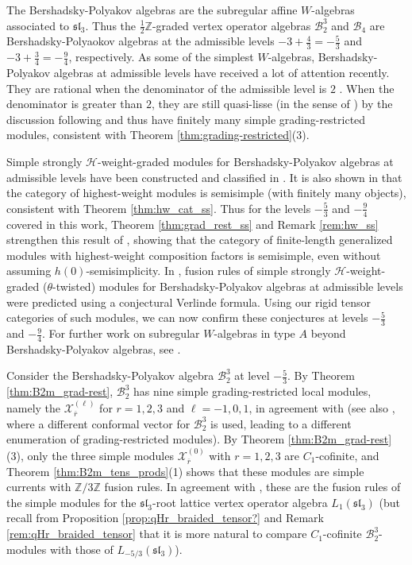 \documentclass[11pt, reqno]{amsart}
\theoremstyle{definition}\newtheorem{defi}[thm]{Definition}
\theoremstyle{definition}\newtheorem{rem}[thm]{Remark}
\theoremstyle{definition}\newtheorem{exam}[thm]{Example}
\theoremstyle{definition}\newtheorem{assum}[thm]{Assumption}
\newcommand{\cB}{\mathcal{B}}
\newcommand{\cH}{\mathcal{H}}
\newcommand{\cX}{\mathcal{X}}
\newcommand{\ZZ}{\mathbb{Z}}
\begin{document}
The Bershadsky-Polyakov algebras \cite{Po, Be} are the subregular affine $W$-algebras associated to $\mathfrak{sl}_3$. Thus the $\frac{1}{2}\ZZ$-graded vertex operator algebras $\cB_2^3$ and $\cB_4$ are Bershadsky-Polyaokov algebras at the admissible levels $-3+\frac{4}{3}=-\frac{5}{3}$ and $-3+\frac{3}{4}=-\frac{9}{4}$, respectively. As some of the simplest $W$-algebras, Bershadsky-Polyakov algebras at admissible levels have received a lot of attention recently. They are rational when the denominator of the admissible level is $2$ \cite{Ar-BP}. When the denominator is greater than $2$, they are still quasi-lisse (in the sense of \cite{AK}) by the discussion following \cite[Lemma 6.3]{AK} and thus have finitely many simple grading-restricted modules, consistent with Theorem \ref{thm:grading-restricted}(3).

Simple strongly $\cH$-weight-graded modules for Bershadsky-Polyakov algebras at admissible levels have been constructed and classified in \cite{AK1, AK2, FKR, AKR}. It is also shown in \cite{FKR} that the category of highest-weight modules is semisimple (with finitely many objects), consistent with Theorem \ref{thm:hw_cat_ss}. Thus for the levels $-\frac{5}{3}$ and $-\frac{9}{4}$ covered in this work, Theorem \ref{thm:grad_rest_ss} and Remark \ref{rem:hw_ss} strengthen this result of \cite{FKR}, showing that the category of finite-length generalized modules with highest-weight composition factors is semisimple, even without assuming $h(0)$-semisimplicity. In \cite{FR}, fusion rules of simple strongly $\cH$-weight-graded ($\theta$-twisted) modules for Bershadsky-Polyakov algebras at admissible levels were predicted using a conjectural Verlinde formula. Using our rigid tensor categories of such modules, we can now confirm these conjectures at levels $-\frac{5}{3}$ and $-\frac{9}{4}$. For further work on subregular $W$-algebras in type $A$ beyond Bershadsky-Polyakov algebras, see \cite{Fe}.

Consider the Bershadsky-Polyakov algebra $\cB_2^3$ at level $-\frac{5}{3}$. By Theorem \ref{thm:B2m_grad-rest}, $\cB_2^3$ has nine simple grading-restricted local modules, namely the $\cX_{\overline{r}}^{(\ell)}$ for $r=1,2,3$ and $\ell=-1,0,1$, in agreement with \cite[Section 5.3.1]{FR} (see also \cite[Section 5]{AK1}, where a different conformal vector for $\cB_2^3$ is used, leading to a different enumeration of grading-restricted modules). By Theorem \ref{thm:B2m_grad-rest}(3), only the three simple modules $\cX_{\overline{r}}^{(0)}$ with $r=1,2,3$ are $C_1$-cofinite, and Theorem \ref{thm:B2m_tens_prods}(1) shows that these modules are simple currents with $\ZZ/3\ZZ$ fusion rules. In agreement with \cite[Proposition 5.9]{FR}, these are the fusion rules of the  simple modules for the $\mathfrak{sl}_3$-root lattice vertex operator algebra $L_1(\mathfrak{sl}_3)$ (but recall from Proposition \ref{prop:qHr_braided_tensor?} and Remark \ref{rem:qHr_braided_tensor} that it is more natural to compare $C_1$-cofinite $\cB_2^3$-modules with those of $L_{-5/3}(\mathfrak{sl}_3)$).
\end{document}
